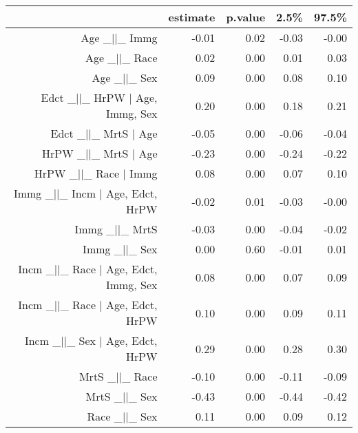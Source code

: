 \begin{table}[ht]
\centering
\begin{tabular}{rrrrr}
  \hline
 & estimate & p.value & 2.5\% & 97.5\% \\ 
  \hline
Age \_$|$$|$\_ Immg & -0.01 & 0.02 & -0.03 & -0.00 \\ 
  Age \_$|$$|$\_ Race & 0.02 & 0.00 & 0.01 & 0.03 \\ 
  Age \_$|$$|$\_ Sex & 0.09 & 0.00 & 0.08 & 0.10 \\ 
  Edct \_$|$$|$\_ HrPW $|$ Age, Immg, Sex & 0.20 & 0.00 & 0.18 & 0.21 \\ 
  Edct \_$|$$|$\_ MrtS $|$ Age & -0.05 & 0.00 & -0.06 & -0.04 \\ 
  HrPW \_$|$$|$\_ MrtS $|$ Age & -0.23 & 0.00 & -0.24 & -0.22 \\ 
  HrPW \_$|$$|$\_ Race $|$ Immg & 0.08 & 0.00 & 0.07 & 0.10 \\ 
  Immg \_$|$$|$\_ Incm $|$ Age, Edct, HrPW & -0.02 & 0.01 & -0.03 & -0.00 \\ 
  Immg \_$|$$|$\_ MrtS & -0.03 & 0.00 & -0.04 & -0.02 \\ 
  Immg \_$|$$|$\_ Sex & 0.00 & 0.60 & -0.01 & 0.01 \\ 
  Incm \_$|$$|$\_ Race $|$ Age, Edct, Immg, Sex & 0.08 & 0.00 & 0.07 & 0.09 \\ 
  Incm \_$|$$|$\_ Race $|$ Age, Edct, HrPW & 0.10 & 0.00 & 0.09 & 0.11 \\ 
  Incm \_$|$$|$\_ Sex $|$ Age, Edct, HrPW & 0.29 & 0.00 & 0.28 & 0.30 \\ 
  MrtS \_$|$$|$\_ Race & -0.10 & 0.00 & -0.11 & -0.09 \\ 
  MrtS \_$|$$|$\_ Sex & -0.43 & 0.00 & -0.44 & -0.42 \\ 
  Race \_$|$$|$\_ Sex & 0.11 & 0.00 & 0.09 & 0.12 \\ 
   \hline
\end{tabular}
\end{table}
